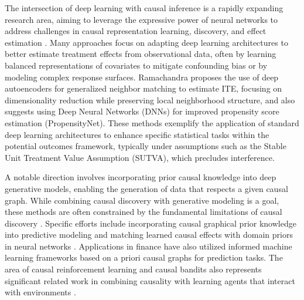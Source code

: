 {The intersection of deep learning with causal inference is a rapidly expanding research area, aiming to leverage the expressive power of neural networks to address challenges in causal representation learning, discovery, and effect estimation \cite{deng2022deep, jiao2024causal}. Many approaches focus on adapting deep learning architectures to better estimate treatment effects from observational data, often by learning balanced representations of covariates to mitigate confounding bias or by modeling complex response surfaces. Ramachandra \cite{ramachandra2018deep} proposes the use of deep autoencoders for generalized neighbor matching to estimate ITE, focusing on dimensionality reduction while preserving local neighborhood structure, and also suggests using Deep Neural Networks (DNNs) for improved propensity score estimation (PropensityNet). These methods exemplify the application of standard deep learning architectures to enhance specific statistical tasks within the potential outcomes framework, typically under assumptions such as the Stable Unit Treatment Value Assumption (SUTVA), which precludes interference.


A notable direction involves incorporating prior causal knowledge into deep generative models, enabling the generation of data that respects a given causal graph. While combining causal discovery with generative modeling is a goal, these methods are often constrained by the fundamental limitations of causal discovery \cite{Glymour2019Review}. Specific efforts include incorporating causal graphical prior knowledge into predictive modeling \cite{Teshima2021Incorporating} and matching learned causal effects with domain priors in neural networks \cite{Kancheti2022Matching}. Applications in finance have also utilized informed machine learning frameworks based on a priori causal graphs for prediction tasks. The area of causal reinforcement learning and causal bandits also represents significant related work in combining causality with learning agents that interact with environments \cite{Lattimore2016Causal, Lee2018Structural, Zhang2022Causal, Bilodeau2022Adaptively, Lu2020Regret, Tennenholtz2021Bandits}.

}
